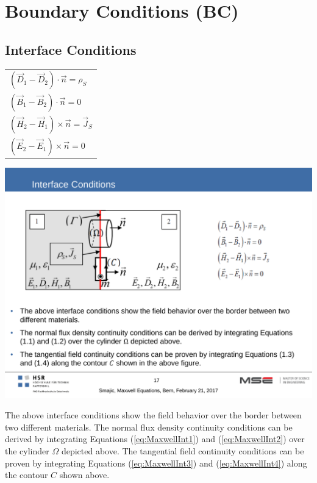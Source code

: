 \section{Boundary Conditions (BC)}
\subsection{Interface Conditions}
\begin{minipage}[rt]{8cm}
	\begin{tabular}{l}
		\(\displaystyle \left(\vec{D}_1 - \vec{D}_2\right) \cdot \vec{n} = \rho_S\) \\
		\(\displaystyle\left(\vec{B}_1 - \vec{B}_2\right) \cdot \vec{n} = 0\)\\
		\(\displaystyle\left(\vec{H}_2 - \vec{H}_1\right) \times \vec{n} =\vec{J}_S\) \\
		\(\displaystyle\left(\vec{E}_2 - \vec{E}_1\right) \times \vec{n} = 0\)\\
	\end{tabular}
\end{minipage}
\begin{minipage}[lt]{11cm}
	\includegraphics[width=.6\textwidth]{./images/InterfaceConditions.pdf}\\
\end{minipage}
The above interface conditions show the field behavior over the border between two different materials. \newline
The normal flux density continuity conditions can be derived by integrating Equations (\ref{eq:MaxwellInt1}) and (\ref{eq:MaxwellInt2}) over the cylinder $\Omega$ depicted above. \newline
The tangential field continuity conditions can be proven by integrating Equations (\ref{eq:MaxwellInt3}) and (\ref{eq:MaxwellInt4}) along the contour $C$ shown above.